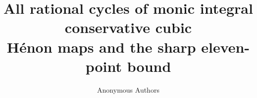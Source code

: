 \documentclass[11pt]{article}
\title{All rational cycles of monic integral conservative cubic\protect\\
H\'enon maps and the sharp eleven-point bound}
\author{Anonymous Authors}
\date{}
\begin{document}
\maketitle
\begin{abstract}

\end{abstract}








\clearpage
\appendix



\end{document}
